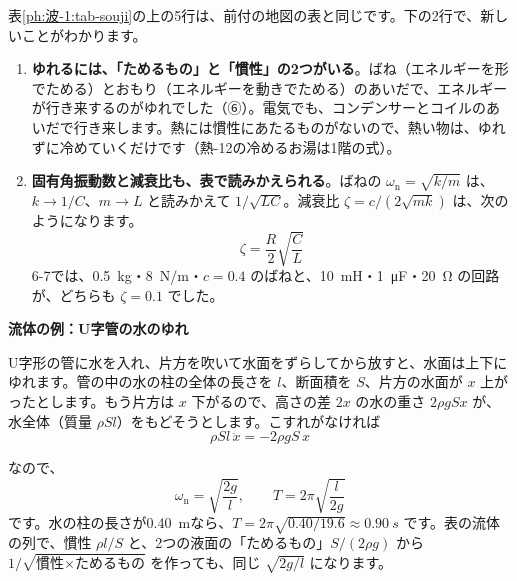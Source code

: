 表\ref{ph:波-1:tab-souji}の上の5行は、前付の地図の表と同じです。下の2行で、新しいことがわかります。
\begin{enumerate}[label={\bkcircled{\arabic*}}, leftmargin=2.4\zw, itemsep=2pt, topsep=2pt]
\item \textbf{ゆれるには、「ためるもの」と「慣性」の2つがいる}。ばね（エネルギーを形でためる）とおもり（エネルギーを動きでためる）のあいだで、エネルギーが行き来するのがゆれでした（⑥）。電気でも、コンデンサーとコイルのあいだで行き来します。熱には慣性にあたるものがないので、熱い物は、ゆれずに冷めていくだけです（熱-12の冷めるお湯は1階の式）。
\item \textbf{固有角振動数と減衰比も、表で読みかえられる}。ばねの $\omega_{\mathrm n}=\sqrt{k/m}$ は、$k\to1/C$、$m\to L$ と読みかえて $1/\sqrt{LC}$。減衰比 $\zeta=c/(2\sqrt{mk})$ は、次のようになります。
\[\zeta=\frac{R}{2}\sqrt{\frac{C}{L}}\]
6-7では、\qty{0.5}{kg}・\qty{8}{N/m}・$c=0.4$ のばねと、\qty{10}{mH}・\qty{1}{\micro F}・\qty{20}{\ohm} の回路が、どちらも $\zeta=0.1$ でした。
\end{enumerate}

\noindent\begin{minipage}[c]{0.36\linewidth}\centering
{}
\end{minipage}\hfill
\begin{minipage}[c]{0.61\linewidth}\raggedright
\textbf{流体の例：U字管の水のゆれ}\par
U字形の管に水を入れ、片方を吹いて水面をずらしてから放すと、水面は上下にゆれます。管の中の水の柱の全体の長さを $l$、断面積を $S$、片方の水面が $x$ 上がったとします。もう片方は $x$ 下がるので、高さの差 $2x$ の水の重さ $2\rho gSx$ が、水全体（質量 $\rho Sl$）をもどそうとします。こすれがなければ
\[\rho Sl\,\ddot x=-2\rho gS\,x\]
\end{minipage}

\par\vspace{4pt}
\noindent なので、
\[\omega_{\mathrm n}=\sqrt{\frac{2g}{l}},\qquad T=2\pi\sqrt{\frac{l}{2g}}\]
です。水の柱の長さが\qty{0.40}{m}なら、$T=2\pi\sqrt{0.40/19.6}\approx\qty{0.90}{s}$ です。表の流体の列で、慣性 $\rho l/S$ と、2つの液面の「ためるもの」$S/(2\rho g)$ から $1/\sqrt{\text{慣性}\times\text{ためるもの}}$ を作っても、同じ $\sqrt{2g/l}$ になります。

